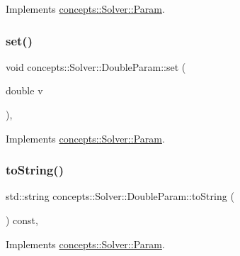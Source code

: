 Implements \hyperlink{classconcepts_1_1_solver_1_1_param_ad3de8144a70e67eeae4278f534e46274}{concepts\+::\+Solver\+::\+Param}.

\mbox{\label{classconcepts_1_1_solver_1_1_double_param_a5a27e7e058121b520d71472e8de549db}} 
\subsubsection{\texorpdfstring{set()}{set()}\hspace{0.1cm}{\footnotesize\ttfamily [3/3]}}
{\footnotesize\ttfamily void concepts\+::\+Solver\+::\+Double\+Param\+::set (\begin{DoxyParamCaption}\item[{double}]{v }\end{DoxyParamCaption})\hspace{0.3cm}{\ttfamily [inline]}, {\ttfamily [virtual]}}



Implements \hyperlink{classconcepts_1_1_solver_1_1_param_a35b7155d8f6db1b3e63e60b883beebcb}{concepts\+::\+Solver\+::\+Param}.

\mbox{\label{classconcepts_1_1_solver_1_1_double_param_a536f65af0681a1e3af0e101f952f717c}} 
\subsubsection{\texorpdfstring{to\+String()}{toString()}}
{\footnotesize\ttfamily std\+::string concepts\+::\+Solver\+::\+Double\+Param\+::to\+String (\begin{DoxyParamCaption}{ }\end{DoxyParamCaption}) const\hspace{0.3cm}{\ttfamily [inline]}, {\ttfamily [virtual]}}



Implements \hyperlink{classconcepts_1_1_solver_1_1_param_abcbd9c68852499c7be9ebf6a2d22f4b5}{concepts\+::\+Solver\+::\+Param}.



